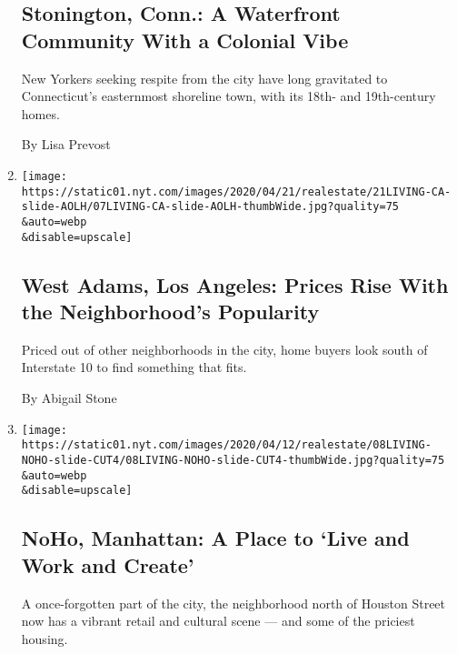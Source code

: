 \begin{enumerate}
  \hypertarget{stonington-conn-a-waterfront-community-with-a-colonial-vibe}{%
  \subsection{Stonington, Conn.: A Waterfront Community With a Colonial
  Vibe}\label{stonington-conn-a-waterfront-community-with-a-colonial-vibe}}

  New Yorkers seeking respite from the city have long gravitated to
  Connecticut's easternmost shoreline town, with its 18th- and
  19th-century homes.

  By Lisa Prevost
\item
  \href{/2020/04/21/realestate/west-adams-los-angeles-prices-rise-with-the-neighborhoods-popularity.html}{}

  \texttt{[image: https://static01.nyt.com/images/2020/04/21/realestate/21LIVING-CA-slide-AOLH/07LIVING-CA-slide-AOLH-thumbWide.jpg?quality=75\\\&auto=webp\\\&disable=upscale]}

  \hypertarget{west-adams-los-angeles-prices-rise-with-the-neighborhoods-popularity}{%
  \subsection{West Adams, Los Angeles: Prices Rise With the
  Neighborhood's
  Popularity}\label{west-adams-los-angeles-prices-rise-with-the-neighborhoods-popularity}}

  Priced out of other neighborhoods in the city, home buyers look south
  of Interstate 10 to find something that fits.

  By Abigail Stone
\item
  \href{/2020/04/15/realestate/noho-nyc-restaurants-retail.html}{}

  \texttt{[image: https://static01.nyt.com/images/2020/04/12/realestate/08LIVING-NOHO-slide-CUT4/08LIVING-NOHO-slide-CUT4-thumbWide.jpg?quality=75\\\&auto=webp\\\&disable=upscale]}

  \hypertarget{noho-manhattan-a-place-to-live-and-work-and-create}{%
  \subsection{NoHo, Manhattan: A Place to `Live and Work and
  Create'}\label{noho-manhattan-a-place-to-live-and-work-and-create}}

  A once-forgotten part of the city, the neighborhood north of Houston
  Street now has a vibrant retail and cultural scene --- and some of the
  priciest housing.


\end{enumerate}
